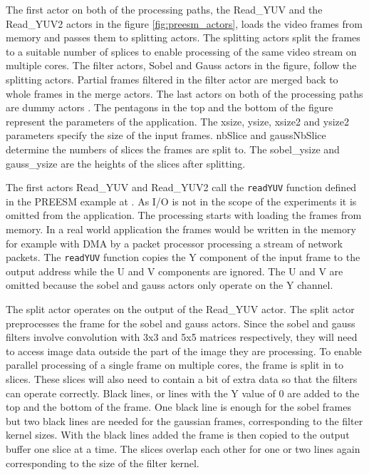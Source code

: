 The first actor on both of the processing paths, the Read\_YUV and the
Read\_YUV2 actors in the figure \ref{fig:preesm_actors}, loads the video frames
from memory and passes them to splitting actors. The splitting actors split the
frames to a suitable number of splices to enable processing of the same video
stream on multiple cores. The filter actors, Sobel and Gauss actors in the
figure, follow the splitting actors. Partial frames filtered in the filter
actor are merged back to whole frames in the merge actors. The last actors on
both of the processing paths are dummy actors . The pentagons in the top and the
bottom of the figure represent the parameters of the application. The xsize,
ysize, xsize2 and ysize2 parameters specify the size of the input frames.
nbSlice and gaussNbSlice determine the numbers of slices the frames are split
to. The sobel\_ysize and gauss\_ysize are the heights of the slices after
splitting.

The first actors Read\_YUV and Read\_YUV2 call the \texttt{readYUV} function
defined in the PREESM example at \cite{preesmtut}. As I/O is not in the scope of
the experiments it is omitted from the application. The processing starts with
loading the frames from memory. In a real world application the frames would be
written in the memory for example with DMA by a packet processor processing a
stream of network packets. The \texttt{readYUV} function copies the Y component
of the input frame to the output address while the U and V components are
ignored. The U and V are omitted because the sobel and gauss actors only operate
on the Y channel. 

The split actor operates on the output of the Read\_YUV actor. The split actor
preprocesses the frame for the sobel and gauss actors. Since the sobel and gauss
filters involve convolution with 3x3 and 5x5 matrices respectively, they will
need to access image data outside the part of the image they are processing. To
enable parallel processing of a single frame on multiple cores, the frame is
split in to slices. These slices will also need to contain a bit of extra data
so that the filters can operate correctly. Black lines, or lines with the Y
value of 0 are added to the top and the bottom of the frame. One black line is
enough for the sobel frames but two black lines are needed for the gaussian
frames, corresponding to the filter kernel sizes. With the black
lines added the frame is then copied to the output buffer one slice at a time.
The slices overlap each other for one or two lines again corresponding to the
size of the filter kernel.

